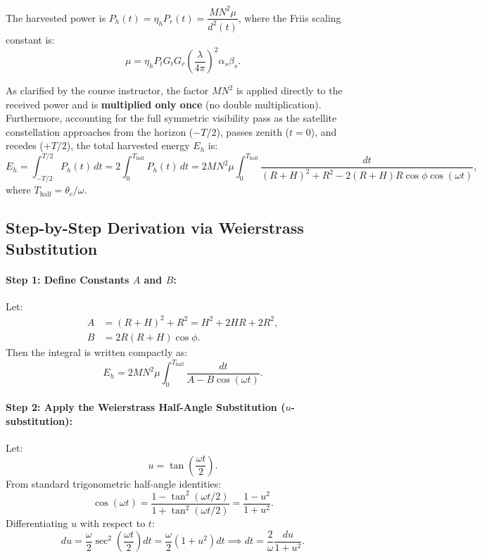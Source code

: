 \documentclass[11pt,a4paper]{article}
\begin{document}
The harvested power is $P_h(t) = \eta_h P_r(t) = \dfrac{M N^2 \mu}{d^2(t)}$, where the Friis scaling constant is:
\begin{equation}
    \mu = \eta_h P_t G_t G_r \left( \frac{\lambda}{4\pi} \right)^2 \alpha_s \beta_s.
\end{equation}

As clarified by the course instructor, the factor $M N^2$ is applied directly to the received power and is \textbf{multiplied only once} (no double multiplication). Furthermore, accounting for the full symmetric visibility pass as the satellite constellation approaches from the horizon ($-T/2$), passes zenith ($t=0$), and recedes ($+T/2$), the total harvested energy $E_h$ is:
\begin{equation}
    E_h = \int_{-T/2}^{T/2} P_h(t) \, dt = 2 \int_0^{T_{\text{half}}} P_h(t) \, dt = 2 M N^2 \mu \int_0^{T_{\text{half}}} \frac{dt}{(R+H)^2 + R^2 - 2(R+H)R \cos\phi \cos(\omega t)},
\end{equation}
where $T_{\text{half}} = \theta_c / \omega$.

\subsection{Step-by-Step Derivation via Weierstrass Substitution}

\paragraph{Step 1: Define Constants $A$ and $B$:}
Let:
\begin{align}
    A &= (R + H)^2 + R^2 = H^2 + 2HR + 2R^2, \\
    B &= 2R(R + H)\cos\phi.
\end{align}
Then the integral is written compactly as:
\begin{equation}
    E_h = 2 M N^2 \mu \int_0^{T_{\text{half}}} \frac{dt}{A - B\cos(\omega t)}.
\end{equation}

\paragraph{Step 2: Apply the Weierstrass Half-Angle Substitution ($u$-substitution):}
Let:
\begin{equation}
    u = \tan\left( \frac{\omega t}{2} \right).
\end{equation}
From standard trigonometric half-angle identities:
\begin{equation}
    \cos(\omega t) = \frac{1 - \tan^2(\omega t / 2)}{1 + \tan^2(\omega t / 2)} = \frac{1 - u^2}{1 + u^2}.
\end{equation}
Differentiating $u$ with respect to $t$:
\begin{equation}
    du = \frac{\omega}{2} \sec^2\left(\frac{\omega t}{2}\right) dt = \frac{\omega}{2}(1 + u^2) dt \implies dt = \frac{2}{\omega} \frac{du}{1 + u^2}.
\end{equation}
\end{document}
